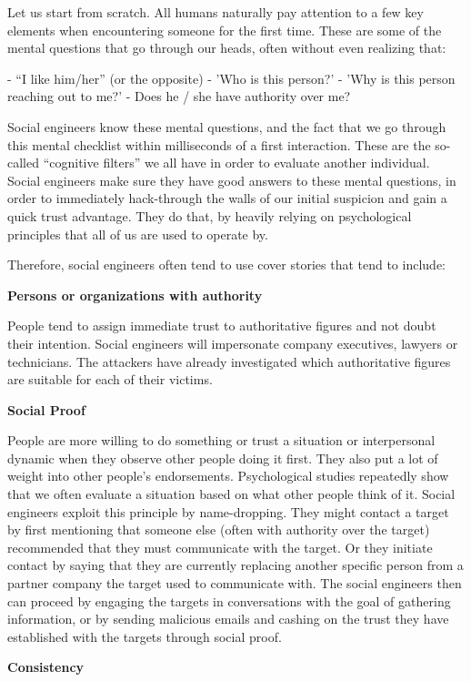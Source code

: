 Let us start from scratch. All humans naturally pay attention to a few key elements when encountering someone for the first time. These are some of the mental questions that go through our heads, often without even realizing that:

- “I like him/her” (or the opposite)
- 'Who is this person?'
- 'Why is this person reaching out to me?'
- Does he / she have authority over me?

Social engineers know these mental questions, and the fact that we go through this mental checklist within milliseconds of a first interaction. These are the so-called “cognitive filters” we all have in order to evaluate another individual. Social engineers make sure they have good answers to these mental questions, in order to immediately hack-through the walls of our initial suspicion and gain a quick trust advantage. They do that, by heavily relying on psychological principles that all of us are used to operate by.

Therefore, social engineers often tend to use cover stories that tend to include:

\textbf{Persons or organizations with authority}

People tend to assign immediate trust to authoritative figures and not doubt their intention. Social engineers will impersonate company executives, lawyers or technicians. The attackers have already investigated which authoritative figures are suitable for each of their victims.

\textbf{Social Proof}

People are more willing to do something or trust a situation or interpersonal dynamic when they observe other people doing it first. They also put a lot of weight into other people’s endorsements. Psychological studies repeatedly show that we often evaluate a situation based on what other people think of it. Social engineers exploit this principle by name-dropping. They might contact a target by first mentioning that someone else (often with authority over the target) recommended that they must communicate with the target. Or they initiate contact by saying that they are currently replacing another specific person from a partner company the target used to communicate with. The social engineers then can proceed by engaging the targets in conversations with the goal of gathering information, or by sending malicious emails and cashing on the trust they have established with the targets through social proof.

\textbf{Consistency}

